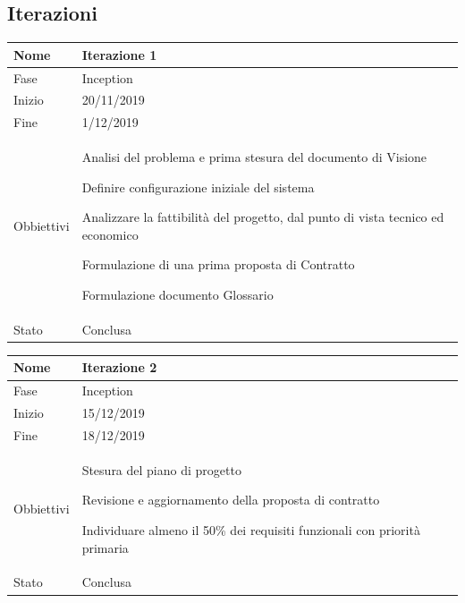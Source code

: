 \subsection{Iterazioni}

\begin{center}

\begin{tabular}{ |p{2cm}|p{10cm}|  }
\hline
Nome & Iterazione 1 \\\hline
Fase & Inception \\\hline
Inizio & 20/11/2019 \\\hline
Fine &  1/12/2019 \\\hline
Obbiettivi & 
	\begin{compactitem}
		\item Analisi del problema e prima stesura del documento di Visione
		\item Definire configurazione iniziale del sistema
		\item Analizzare la fattibilità del progetto, dal punto di vista tecnico ed economico
		\item Formulazione di una prima proposta di Contratto
		\item Formulazione documento Glossario
	\end{compactitem}\\\hline
Stato &  Conclusa \\\hline
\end{tabular}
\label{table:1}\newline

\begin{tabular}{ |p{2cm}|p{10cm}|  }
\hline
Nome & Iterazione 2 \\\hline
Fase & Inception \\\hline
Inizio & 15/12/2019 \\\hline
Fine &  18/12/2019 \\\hline
Obbiettivi & 
	\begin{compactitem}
		\item Stesura del piano di progetto
		\item Revisione e aggiornamento della proposta di contratto
		\item Individuare almeno il 50\% dei requisiti funzionali con priorità primaria
	\end{compactitem}\\\hline
Stato &  Conclusa \\\hline
\end{tabular}
\label{table:2}\newline


\end{center}
